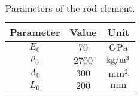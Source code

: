 \begin{table}[H]
    \centering
    \begin{tabular}{|c|c|c|}
        \hline
        \textbf{Parameter} & \textbf{Value} & \textbf{Unit}                    \\ \hline
        $E_0$              & $70$           & $\text{GPa}$                     \\ \hline
        $\rho_0$           & $2700$         & $\text{kg/m\textsuperscript{3}}$ \\ \hline
        $A_0$              & $300$          & $\text{mm}^2$                    \\ \hline
        $L_0$              & $200$          & $\text{mm}$                      \\ \hline
    \end{tabular}
    \caption{Parameters of the rod element.}
    \label{tab:parameters_of_the_system}
\end{table}
